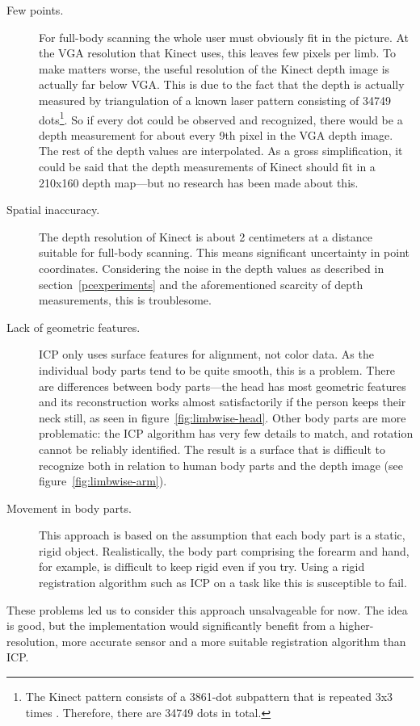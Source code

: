 \begin{description}
    \item[Few points.] For full-body scanning the whole user must obviously fit in the picture. At the VGA resolution that Kinect uses, this leaves few pixels per limb. To make matters worse, the useful resolution of the Kinect depth image is actually far below VGA. This is due to the fact that the depth is actually measured by triangulation of a known laser pattern consisting of 34749 dots\footnote{The Kinect pattern consists of a 3861-dot subpattern that is repeated 3x3 times \citep{reichinger2011}. Therefore, there are 34749 dots in total.}. So if every dot could be observed and recognized, there would be a depth measurement for about every 9th pixel in the VGA depth image. The rest of the depth values are interpolated. As a gross simplification, it could be said that the depth measurements of Kinect should fit in a 210x160 depth map---but no research has been made about this.
    \item[Spatial inaccuracy.] The depth resolution of Kinect is about 2 centimeters at a distance suitable for full-body scanning. This means significant uncertainty in point coordinates. Considering the noise in the depth values as described in section~\ref{pcexperiments} and the aforementioned scarcity of depth measurements, this is troublesome.
    \item[Lack of geometric features.] ICP only uses surface features for alignment, not color data. As the individual body parts tend to be quite smooth, this is a problem. There are differences between body parts---the head has most geometric features and its reconstruction works almost satisfactorily if the person keeps their neck still, as seen in figure~\ref{fig:limbwise-head}. Other body parts are more problematic: the ICP algorithm has very few details to match, and rotation cannot be reliably identified. The result is a surface that is difficult to recognize both in relation to human body parts and the depth image (see figure~\ref{fig:limbwise-arm}).
    \item[Movement in body parts.] This approach is based on the assumption that each body part is a static, rigid object. Realistically, the body part comprising the forearm and hand, for example, is difficult to keep rigid even if you try. Using a rigid registration algorithm such as ICP on a task like this is susceptible to fail.
\end{description}

These problems led us to consider this approach unsalvageable for now. The idea is good, but the implementation would significantly benefit from a higher-resolution, more accurate sensor and a more suitable registration algorithm than ICP.

